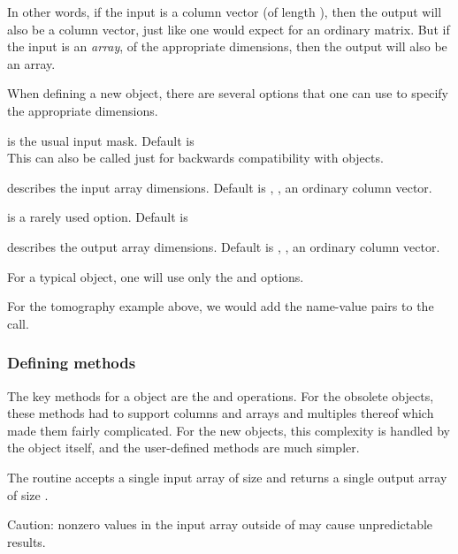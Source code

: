 In other words,
if the input is a column vector (of length \np),
then the output will also be a column vector,
just like one would expect for an ordinary matrix.
But if the input is an \emph{array},
of the appropriate dimensions,
then the output will also be an array.

When defining a new \fatrixx object,
there are several options
that one can use to specify
the appropriate dimensions.

\blist
\item
{}
is the usual input mask.
Default is 
\\
This can also be called just 
for backwards compatibility with \fatrix objects.

\item
{}
describes the input array dimensions.
Default is ,
\ie, an ordinary column vector.

\item
{}
is a rarely used option.
Default is 

\item
{}
describes the output array dimensions.
Default is ,
\ie, an ordinary column vector.
\elist

For a typical \fatrixx object,
one will use only the  and  options.

For the tomography example above,
we would add the name-value pairs
to the  call.


\subsubsection{Defining \fatrixx methods}

The key methods for a \fatrixx object
are the  and  operations.
For the obsolete \fatrix objects,
these methods had to support columns and arrays
and multiples thereof
which made them fairly complicated.
For the new \fatrixx objects,
this complexity is handled by the object itself,
and the user-defined methods are much simpler.

\blist
\item
The  routine
accepts a single input array
of size 
and returns a single output array
of size .

\item
Caution:
nonzero values in the input array
outside of 
may cause unpredictable results.

